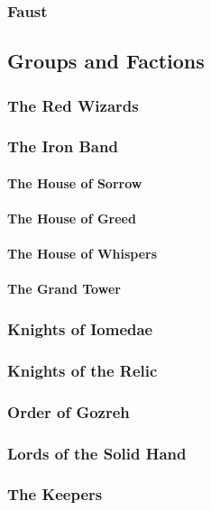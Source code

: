 		\subsubsection{Faust}

	\subsection{Groups and Factions}

		\subsubsection{The Red Wizards}

		\subsubsection{The Iron Band}
			\paragraph{The House of Sorrow}
			\paragraph{The House of Greed}
			\paragraph{The House of Whispers}
			\paragraph{The Grand Tower}

		\subsubsection{Knights of Iomedae}

		\subsubsection{Knights of the Relic}

		\subsubsection{Order of Gozreh}

		\subsubsection{Lords of the Solid Hand}

		\subsubsection{The Keepers}

